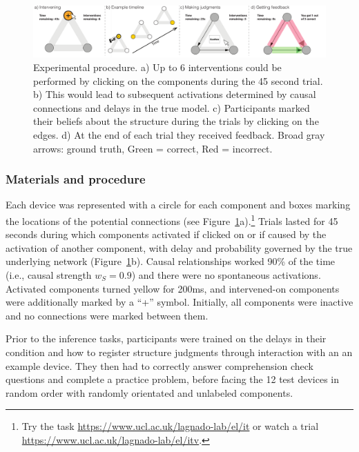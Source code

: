 \documentclass[10pt,letterpaper]{article}
\newcommand{\ws}{w_S} %
\begin{document}
\begin{figure}[t]
\vspace{-.5cm}
   \centering
   \includegraphics[width = .98\textwidth]{procedure}
   \caption{Experimental procedure. a) Up to 6 interventions could be performed by clicking on the components during the 45 second trial.  b) This would lead to subsequent activations determined by causal connections and delays in the true model.  c) Participants marked their beliefs about the structure during the trials by clicking on the edges.  d) At the end of each trial they received feedback.  Broad gray arrows: ground truth, Green = correct, Red = incorrect.}
   \label{fig:procedure}
   \vspace{-0.6cm}
\end{figure}

\subsubsection*{Materials and procedure}

Each device was represented with a circle for each component and boxes marking the locations of the potential connections (see Figure~\ref{fig:procedure}a).\footnote{Try the task \url{https://www.ucl.ac.uk/lagnado-lab/el/it} or watch a trial \url{https://www.ucl.ac.uk/lagnado-lab/el/itv}.} 
Trials lasted for 45 seconds during which components activated if clicked on or if caused by the activation of another component, with delay and probability governed by the true underlying network (Figure~\ref{fig:procedure}b).  Causal relationships worked 90\% of the time (i.e., causal strength $\ws=0.9$) and there were no spontaneous activations.  Activated components turned yellow for 200ms, and intervened-on components were additionally marked by a ``+'' symbol. Initially, all components were inactive and no connections were marked between them.

Prior to the inference tasks, participants were trained on the delays in their condition and how to register structure judgments through interaction with an an example device.  They then had to correctly answer comprehension check questions and complete a practice problem, before facing the 12 test devices in random order with randomly orientated and unlabeled components.
\end{document}
